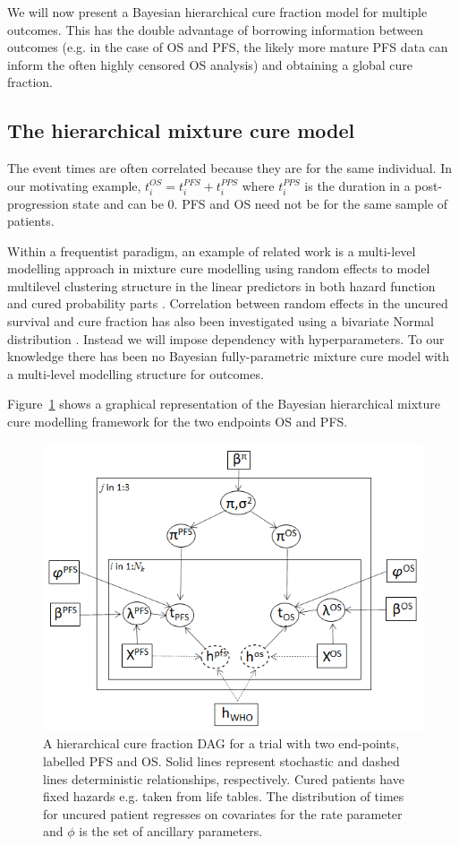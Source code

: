 \documentclass[AMA,STIX1COL]{WileyNJD-v2}
\begin{document}
We will now present a Bayesian hierarchical cure fraction model for multiple outcomes.
This has the double advantage of borrowing information between outcomes
(e.g. in the case of OS and PFS, the likely more mature PFS data can inform the often highly censored OS analysis) and obtaining a global cure fraction.

%
\subsection{The hierarchical mixture cure model} \label{section:hier_model}
The event times are often correlated because they are for the same individual.
In our motivating example, $t_i^{OS} = t_i^{PFS} + t_i^{PPS}$ where $t_i^{PPS}$ is the duration in a post-progression state and can be $0$.
PFS and OS need not be for the same sample of patients.

Within a frequentist paradigm, an example of related work is a multi-level modelling approach in mixture cure modelling using random effects to model multilevel clustering structure in the linear predictors in both hazard function and cured probability parts \cite{Lai2009}.
Correlation between random effects in the uncured survival and cure fraction has also been investigated using a bivariate Normal distribution \cite{Lai2008} \cite{Tan2018}.
Instead we will impose dependency with hyperparameters.
To our knowledge there has been no Bayesian fully-parametric mixture cure model with a multi-level modelling structure for outcomes.

Figure~\ref{fig:hier_dag} shows a graphical representation of the Bayesian hierarchical mixture cure modelling framework for the two endpoints OS and PFS.

\begin{figure}
\centering
\includegraphics[width=0.6\linewidth]{DAG_with_Tx.png}
\caption{\label{fig:hier_dag} A hierarchical cure fraction DAG for a trial with two end-points, labelled PFS and OS.
Solid lines represent stochastic and dashed lines deterministic relationships, respectively.
Cured patients have fixed hazards e.g. taken from life tables.
The distribution of times for uncured patient regresses on covariates for the rate parameter and $\phi$ is the set of ancillary parameters.}
\end{figure}
\end{document}
